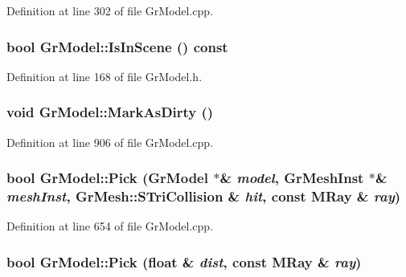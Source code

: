 Definition at line 302 of file GrModel.cpp.\hypertarget{class_gr_model_2c82df629316012566ad43ae802e1ed9}{
\subsubsection[{IsInScene}]{\setlength{\rightskip}{0pt plus 5cm}bool GrModel::IsInScene () const}}
\label{class_gr_model_2c82df629316012566ad43ae802e1ed9}




Definition at line 168 of file GrModel.h.\hypertarget{class_gr_model_b29ae276eab8a6460d09a0f727765c40}{
\subsubsection[{MarkAsDirty}]{\setlength{\rightskip}{0pt plus 5cm}void GrModel::MarkAsDirty ()}}
\label{class_gr_model_b29ae276eab8a6460d09a0f727765c40}




Definition at line 906 of file GrModel.cpp.\hypertarget{class_gr_model_525915234ad6fe9e03ee62e699d27fad}{
\subsubsection[{Pick}]{\setlength{\rightskip}{0pt plus 5cm}bool GrModel::Pick ({\bf GrModel} $\ast$\& {\em model}, \/  {\bf GrMeshInst} $\ast$\& {\em meshInst}, \/  {\bf GrMesh::STriCollision} \& {\em hit}, \/  const {\bf MRay} \& {\em ray})}}
\label{class_gr_model_525915234ad6fe9e03ee62e699d27fad}




Definition at line 654 of file GrModel.cpp.\hypertarget{class_gr_model_fbbc5426863525467f35ff2df3cca3ce}{
\subsubsection[{Pick}]{\setlength{\rightskip}{0pt plus 5cm}bool GrModel::Pick (float \& {\em dist}, \/  const {\bf MRay} \& {\em ray})}}
\label{class_gr_model_fbbc5426863525467f35ff2df3cca3ce}




